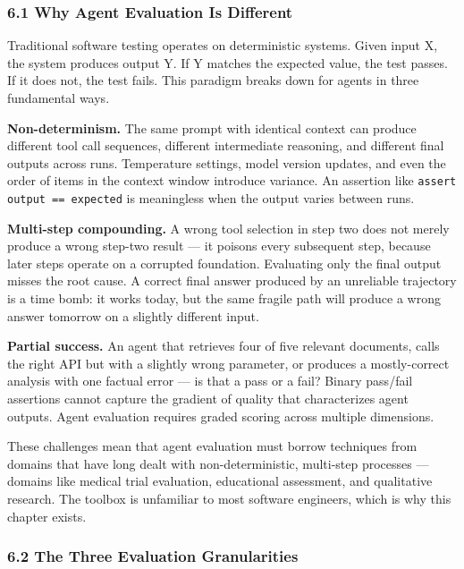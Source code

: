 \documentclass[11pt, a4paper]{article}
\newcommand{\passthrough}[1]{#1}
\begin{document}
\hypertarget{why-agent-evaluation-is-different}{%
\subsubsection{6.1 Why Agent Evaluation Is
Different}\label{why-agent-evaluation-is-different}}

Traditional software testing operates on deterministic systems. Given
input X, the system produces output Y. If Y matches the expected value,
the test passes. If it does not, the test fails. This paradigm breaks
down for agents in three fundamental ways.

\textbf{Non-determinism.} The same prompt with identical context can
produce different tool call sequences, different intermediate reasoning,
and different final outputs across runs. Temperature settings, model
version updates, and even the order of items in the context window
introduce variance. An assertion like
\passthrough{\lstinline!assert output == expected!} is meaningless when
the output varies between runs.

\textbf{Multi-step compounding.} A wrong tool selection in step two does
not merely produce a wrong step-two result --- it poisons every
subsequent step, because later steps operate on a corrupted foundation.
Evaluating only the final output misses the root cause. A correct final
answer produced by an unreliable trajectory is a time bomb: it works
today, but the same fragile path will produce a wrong answer tomorrow on
a slightly different input.

\textbf{Partial success.} An agent that retrieves four of five relevant
documents, calls the right API but with a slightly wrong parameter, or
produces a mostly-correct analysis with one factual error --- is that a
pass or a fail? Binary pass/fail assertions cannot capture the gradient
of quality that characterizes agent outputs. Agent evaluation requires
graded scoring across multiple dimensions.

These challenges mean that agent evaluation must borrow techniques from
domains that have long dealt with non-deterministic, multi-step
processes --- domains like medical trial evaluation, educational
assessment, and qualitative research. The toolbox is unfamiliar to most
software engineers, which is why this chapter exists.

\hypertarget{the-three-evaluation-granularities}{%
\subsubsection{6.2 The Three Evaluation
Granularities}\label{the-three-evaluation-granularities}}
\end{document}
